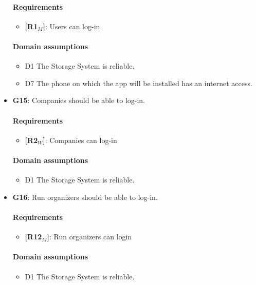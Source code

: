 \begin{itemize}
    \paragraph{Requirements}
   \begin{itemize}
    \item \textbf{[R1$_M$]}: Users can log-in
   \end{itemize}
   
   \paragraph{Domain assumptions}
   \begin{itemize}
    \item  D1  The Storage System is reliable.
    \item  D7  The phone on which the app will be installed has an internet access.
   \end{itemize}
   
   \item \textbf{G15}: Companies should be able to log-in.
    \paragraph{Requirements}
   \begin{itemize}
    \item \textbf{[R2$_W$]}: Companies can log-in
   \end{itemize}
   
   \paragraph{Domain assumptions}
   \begin{itemize}
    \item  D1  The Storage System is reliable.
   \end{itemize}
   
 \item \textbf{G16}: Run organizers should be able to log-in.
    \paragraph{Requirements}
   \begin{itemize}
    \item \textbf{[R12$_M$]}: Run organizers can login
   \end{itemize}
   
   \paragraph{Domain assumptions}
   \begin{itemize}
    \item  D1  The Storage System is reliable.
   \end{itemize}
   \end{itemize}

   
   